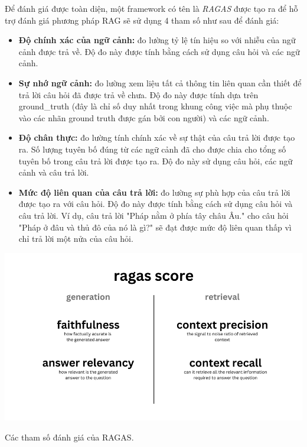 \documentclass[a4paper, 12pt, openany]{book}
\begin{document}
Để đánh giá được toàn diện, một framework có tên là \textit{RAGAS} được tạo ra để hỗ trợ đánh giá phương pháp RAG
sẽ sử dụng 4 tham số như sau để đánh giá:

\begin{itemize}
    \item \textbf{Độ chính xác của ngữ cảnh:} đo lường tỷ lệ tín hiệu so với nhiễu của ngữ cảnh được trả về. Độ đo này được tính bằng cách sử dụng câu hỏi và các ngữ cảnh.
    \item \textbf{Sự nhớ ngữ cảnh:} đo lường xem liệu tất cả thông tin liên quan cần thiết để trả lời câu hỏi đã được trả về chưa. Độ đo này được tính dựa trên ground\_truth (đây là chỉ số duy nhất trong khung công việc mà phụ thuộc vào các nhãn ground truth được gán bởi con người) và các ngữ cảnh.
    \item \textbf{Độ chân thực:} đo lường tính chính xác về sự thật của câu trả lời được tạo ra. Số lượng tuyên bố đúng từ các ngữ cảnh đã cho được chia cho tổng số tuyên bố trong câu trả lời được tạo ra. Độ đo này sử dụng câu hỏi, các ngữ cảnh và câu trả lời.
    \item \textbf{Mức độ liên quan của câu trả lời:} đo lường sự phù hợp của câu trả lời được tạo ra với câu hỏi. Độ đo này được tính bằng cách sử dụng câu hỏi và câu trả lời. Ví dụ, câu trả lời "Pháp nằm ở phía tây châu Âu." cho câu hỏi "Pháp ở đâu và thủ đô của nó là gì?" sẽ đạt được mức độ liên quan thấp vì chỉ trả lời một nửa của câu hỏi.
\end{itemize}

\begin{minipage}{\linewidth}
    \centering
    \includegraphics[width=\linewidth]{./assets/images/component-wise-metrics.png}
    \captionsetup{type=figure}
    \caption{Các tham số đánh giá của RAGAS.}
\end{minipage}
\vspace{0.5cm}
\end{document}
